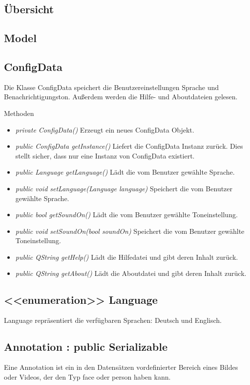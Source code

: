 \subsection{Übersicht}

\subsection{Model}

\subsection*{ConfigData}
Die Klasse ConfigData speichert die Benutzereinstellungen Sprache und Benachrichtigungston. Außerdem werden die Hilfe- und Aboutdateien gelesen.

Methoden
\begin{itemize}
\item \textit{private ConfigData()} Erzeugt ein neues ConfigData Objekt.
\item \textit{public ConfigData getInstance()} Liefert die ConfigData Instanz zurück. Dies stellt sicher, dass nur eine Instanz von ConfigData existiert.
\item \textit{public Language getLanguage()} Lädt die vom Benutzer gewählte Sprache.
\item \textit{public void setLanguage(Language language)} Speichert die vom Benutzer gewählte Sprache.
\item \textit{public bool getSoundOn()} Lädt die vom Benutzer gewählte Toneinstellung.
\item \textit{public void setSoundOn(bool soundOn)} Speichert die vom Benutzer gewählte Toneinstellung.
\item \textit{public QString getHelp()} Lädt die Hilfedatei und gibt deren Inhalt zurück.
\item \textit{public QString getAbout()} Lädt die Aboutdatei und gibt deren Inhalt zurück.
\end{itemize}

\subsection*{<<enumeration>> Language}
Language repräsentiert die verfügbaren Sprachen: Deutsch und Englisch.

\subsection*{Annotation : public Serializable}
Eine Annotation ist ein in den Datensätzen vordefinierter Bereich eines Bildes oder Videos, der den Typ face oder person haben kann.

